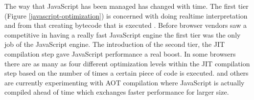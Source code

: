 The way that JavaScript has been managed has changed with time. The first tier (Figure \ref{javascript-optimization}) is concerned with doing realtime interpretation and from that creating bytecode that is executed \parencite{ParkKimMoon2017}. Before browser vendors saw a competitive in having a really fast JavaScript engine the first tier was the only job of the JavaScript engine. The introduction of the second tier, the JIT compilation step gave JavaScript performance a real boost. In some browsers there are as many as four different optimization levels within the JIT compilation step based on the number of times a certain piece of code is executed. \textcite{ZhuykovVardanyanMelnikBuchatskiySharygin2015} and others are currently experimenting with AOT compilation where JavaScript is actually compiled ahead of time which exchanges faster performance for larger size.









